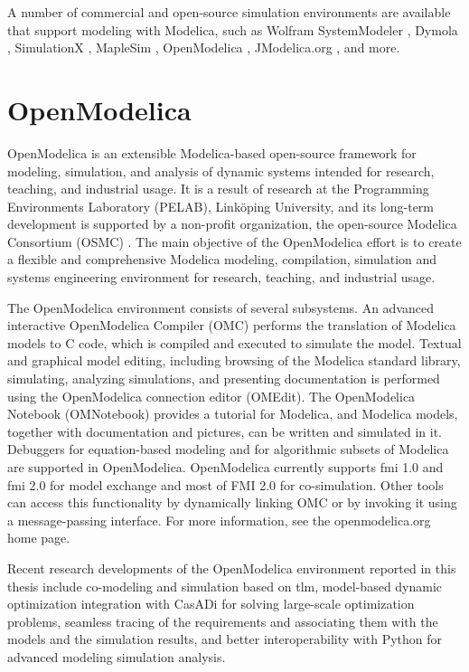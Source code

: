 A number of commercial and open-source simulation environments are available that support modeling with Modelica, such as Wolfram SystemModeler \cite{wolfram, wolframmats, wolframpeter}, Dymola \cite{dymola, dymoladag}, SimulationX \cite{simulationx}, MapleSim \cite{maplesim}, OpenModelica \cite{openmodelica,openmodelicapeter}, JModelica.org \cite{jmodelica}, and more. 


\section{OpenModelica}
\label{sec:openmodelica}

OpenModelica \cite{openmodelica,openmodelicapeter} is an extensible Modelica-based open-source framework for modeling, simulation, and analysis of dynamic systems intended for research, teaching, and industrial usage. It is a result of research at the Programming Environments Laboratory (PELAB), Link\"{o}ping University, and its long-term development is supported by a non-profit organization, the open-source Modelica Consortium (OSMC) \cite{osmc}. The main objective of the OpenModelica effort is to create a flexible and comprehensive Modelica modeling, compilation, simulation and systems engineering environment for research, teaching, and industrial usage.

The OpenModelica environment consists of several subsystems. An advanced interactive OpenModelica Compiler (OMC) performs the translation of Modelica models to C code, which is compiled and executed to simulate the model. Textual and graphical model editing, including browsing of the Modelica standard library, simulating, analyzing simulations, and presenting documentation is performed using the OpenModelica connection editor (OMEdit). The OpenModelica Notebook (OMNotebook) provides a tutorial for Modelica, and Modelica models, together with documentation and pictures, can be written and simulated in it. Debuggers for equation-based modeling and for algorithmic subsets of Modelica are supported in OpenModelica. OpenModelica currently supports \acrshort{fmi} 1.0 and \acrshort{fmi} 2.0 for model exchange and most of FMI 2.0 for co-simulation. Other tools can access this functionality by dynamically linking OMC or by invoking it using a message-passing interface. For more information, see the openmodelica.org \cite{openmodelica} home page.

Recent research developments of the OpenModelica environment reported in this thesis include co-modeling and simulation based on \acrshort{tlm}, model-based dynamic optimization integration with CasADi \cite{casadi} for solving large-scale optimization problems, seamless tracing of the requirements and associating them with the models and the simulation results, and better interoperability with Python for advanced modeling simulation analysis.


